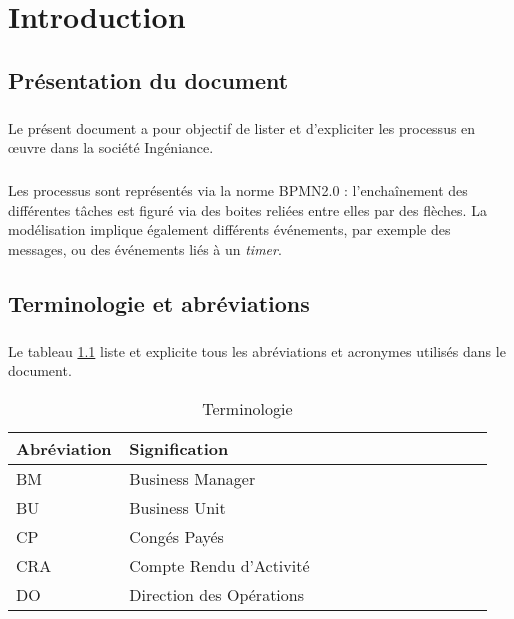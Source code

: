 \documentclass[12pt]{scrreprt}
\author{Direction des opérations}
\date{Avril 2016}
\begin{document}

\tableofcontents

\initIngeniance

\chapter{Introduction}

\section{Présentation du document}
\paragraph{} Le présent document a pour objectif de lister et d'expliciter les processus en œuvre dans la société Ingéniance.
\paragraph{} Les processus sont représentés via la norme BPMN2.0 : l’enchaînement des différentes tâches est figuré via des boites reliées entre elles par des flèches. La modélisation implique également différents événements, par exemple des messages, ou des événements liés à un \textit{timer}.


\section{Terminologie et abréviations}
\paragraph{} Le tableau \ref{abbr} liste et explicite tous les abréviations et acronymes utilisés dans le document.
\begin{table}[H]
\begin{center}
    \begin{longtable}{|p{0.2\linewidth}|p{0.75\linewidth}|}
    \hline  %
    \rowcolor[gray]{.8}
    Abréviation & Signification\\
    \hline
    BM & Business Manager\\
    \hline
    BU & Business Unit \\
    \hline
    CP & Congés Payés\\
    \hline
    CRA & Compte Rendu d'Activité\\
    \hline
    DO & Direction des Opérations\\
    \hline
    \end{longtable}
    \caption{Terminologie}
    \label{abbr}
\end{center}
\end{table}
\end{document}
